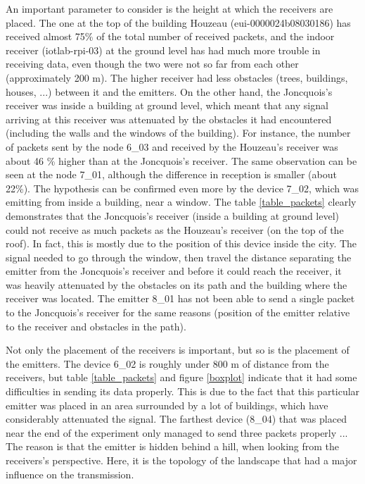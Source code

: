 \documentclass[letterpaper, 10 pt, conference]{ieeeconf}  %
\begin{document}
An important parameter to consider is the height at which the receivers are placed. The one at the top of the building Houzeau (eui-0000024b08030186) has received almost 75\% of the total number of received packets, and the indoor receiver (iotlab-rpi-03) at the  ground level has had much more trouble in receiving data, even though the two were not so far from each other (approximately 200 m). The higher receiver had less obstacles (trees, buildings, houses, ...) between it and the emitters. On the other hand, the Joncquois's receiver was inside a building at ground level, which meant that any signal arriving at this receiver was attenuated by the obstacles it had encountered (including the walls and the windows of the building)\cite{c16}. For instance, the number of packets sent by the node 6\_03 and received by the Houzeau's receiver was about 46 \% higher than at the Joncquois's receiver. The same observation can be seen at the node 7\_01, although the difference in reception is smaller (about 22\%). The hypothesis can be confirmed even more by the device 7\_02, which was emitting from inside a building, near a window. The table \ref{table_packets} clearly demonstrates that the Joncquois's receiver (inside a building at ground level) could not receive as much packets as the Houzeau's receiver (on the top of the roof). In fact, this is mostly due to the position of this device inside the city. The signal needed to go through the window, then travel the distance separating the emitter from the Joncquois's receiver and before it could reach the receiver, it was heavily attenuated by the obstacles on its path and the building where the receiver was located. The emitter 8\_01 has not been able to send a single packet to the Joncquois's receiver for the same reasons (position of the emitter relative to the receiver and obstacles in the path).

Not only the placement of the receivers is important, but so is the placement of the emitters. The device 6\_02 is roughly under 800 m of distance from the receivers, but table \ref{table_packets} and figure \ref{boxplot} indicate that it had some difficulties in sending its data properly. This is due to the fact that this particular emitter was placed in an area surrounded by a lot of buildings, which have considerably attenuated the signal. The farthest device (8\_04) that was placed near the end of the experiment only managed to send three packets properly ... The reason is that the emitter is hidden behind a hill, when looking from the receivers's perspective. Here, it is the topology of the landscape that had a major influence on the transmission.
\end{document}
